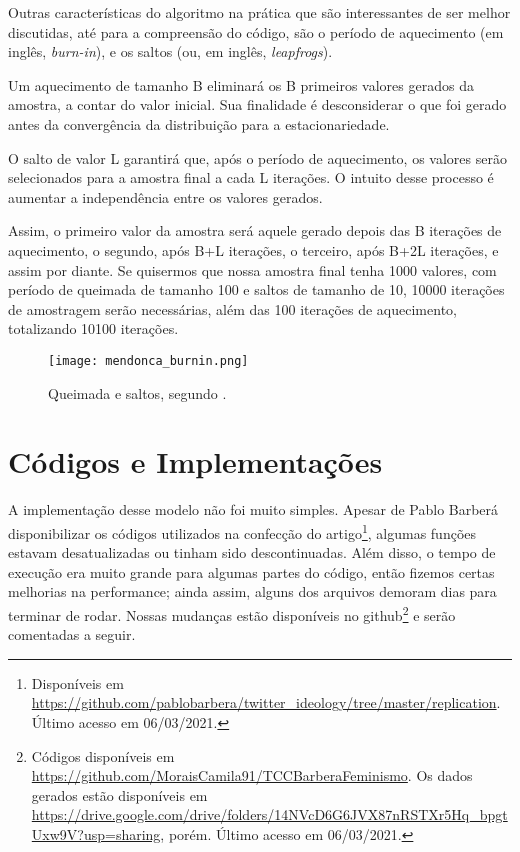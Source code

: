 \documentclass[
	12pt,				%
	openright,			%
	twoside,			%
	a4paper,			%
	english,			%
	brazil				%
	]{abntex2}
\begin{document}
\begin{anexosenv}
 Outras características do algoritmo na prática que são interessantes de ser melhor discutidas, até para a compreensão do código, são o período de aquecimento (em inglês, \emph{burn-in}), e os saltos (ou, em inglês, \emph{leapfrogs}).

 Um aquecimento de tamanho B eliminará os B primeiros valores gerados da amostra, a contar do valor inicial. Sua finalidade é desconsiderar o que foi gerado antes da convergência da distribuição para a estacionariedade.

 O salto de valor L garantirá que, após o período de aquecimento, os valores serão selecionados para a amostra final a cada L iterações. O intuito desse processo é aumentar a independência entre os valores gerados.

 Assim, o primeiro valor da amostra será aquele gerado depois das B iterações de aquecimento, o segundo, após B+L iterações, o terceiro, após B+2L iterações, e assim por diante. Se quisermos que nossa amostra final tenha 1000 valores, com período de queimada de tamanho 100 e saltos de tamanho de 10, 10000 iterações de amostragem serão necessárias, além das 100 iterações de aquecimento, totalizando 10100 iterações.
 
 \begin{figure}[!htbp]
    \centering
    \texttt{[image: mendonca\_burnin.png]}
    \caption{Queimada e saltos, segundo \cite[p.~33]{mendonca2008}.}
    \label{fig:mendoncaburnin}
 \end{figure}
 
 \chapter{Códigos e Implementações}\label{codigoimplementacao}
 A implementação desse modelo não foi muito simples. Apesar de Pablo Barberá disponibilizar os códigos utilizados na confecção do artigo\footnote{Disponíveis em \url{https://github.com/pablobarbera/twitter_ideology/tree/master/replication}. Último acesso em 06/03/2021.}, algumas funções estavam desatualizadas ou tinham sido descontinuadas. Além disso, o tempo de execução era muito grande para algumas partes do código, então fizemos certas melhorias na performance; ainda assim, alguns dos arquivos demoram dias para terminar de rodar. Nossas mudanças estão disponíveis no github\footnote{Códigos disponíveis em \url{https://github.com/MoraisCamila91/TCCBarberaFeminismo}. Os dados gerados estão disponíveis em \url{https://drive.google.com/drive/folders/14NVcD6G6JVX87nRSTXr5Hq_bpgtUxw9V?usp=sharing}, porém. Último acesso em 06/03/2021.} e serão comentadas a seguir.
 

\end{anexosenv}
\end{document}
